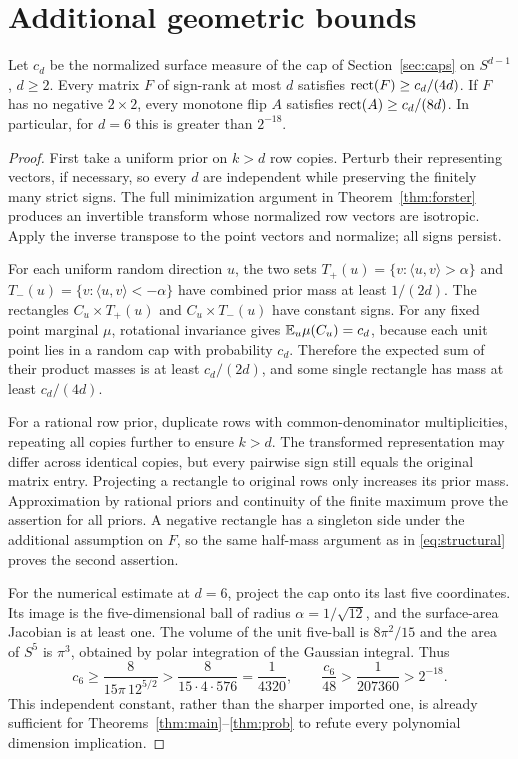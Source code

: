 \section{Additional geometric bounds}\label{app:oldgeometry}
\begin{samepage}
\begin{proposition}\label{prop:cap-bound}
Let $c_d$ be the normalized surface measure of the cap of Section~\ref{sec:caps} on $S^{d-1}$, $d\ge2$. Every matrix $F$ of sign-rank at most $d$ satisfies $\operatorname{rect}(F)\ge c_d/(4d)$. If $F$ has no negative $2\times2$, every monotone flip $A$ satisfies $\operatorname{rect}(A)\ge c_d/(8d)$. In particular, for $d=6$ this is greater than $2^{-18}$.
\end{proposition}
\end{samepage}
\begin{proof}
First take a uniform prior on $k>d$ row copies. Perturb their representing vectors, if necessary, so every $d$ are independent while preserving the finitely many strict signs. The full minimization argument in Theorem~\ref{thm:forster} produces an invertible transform whose normalized row vectors are isotropic. Apply the inverse transpose to the point vectors and normalize; all signs persist.

For each uniform random direction $u$, the two sets $T_+(u)=\{v:\langle u,v\rangle>\alpha\}$ and $T_-(u)=\{v:\langle u,v\rangle<-\alpha\}$ have combined prior mass at least $1/(2d)$. The rectangles $C_u\times T_+(u)$ and $C_u\times T_-(u)$ have constant signs. For any fixed point marginal $\mu$, rotational invariance gives $\mathbb E_u\mu(C_u)=c_d$, because each unit point lies in a random cap with probability $c_d$. Therefore the expected sum of their product masses is at least $c_d/(2d)$, and some single rectangle has mass at least $c_d/(4d)$.

For a rational row prior, duplicate rows with common-denominator multiplicities, repeating all copies further to ensure $k>d$. The transformed representation may differ across identical copies, but every pairwise sign still equals the original matrix entry. Projecting a rectangle to original rows only increases its prior mass. Approximation by rational priors and continuity of the finite maximum prove the assertion for all priors. A negative rectangle has a singleton side under the additional assumption on $F$, so the same half-mass argument as in \eqref{eq:structural} proves the second assertion.

For the numerical estimate at $d=6$, project the cap onto its last five coordinates. Its image is the five-dimensional ball of radius $\alpha=1/\sqrt{12}$, and the surface-area Jacobian is at least one. The volume of the unit five-ball is $8\pi^2/15$ and the area of $S^5$ is $\pi^3$, obtained by polar integration of the Gaussian integral. Thus
\[
 c_6\ge\frac8{15\pi\,12^{5/2}}>
 \frac8{15\cdot4\cdot576}=\frac1{4320},
 \qquad \frac{c_6}{48}>\frac1{207360}>2^{-18}.
\]
This independent constant, rather than the sharper imported one, is already sufficient for Theorems~\ref{thm:main}--\ref{thm:prob} to refute every polynomial dimension implication.
\end{proof}
